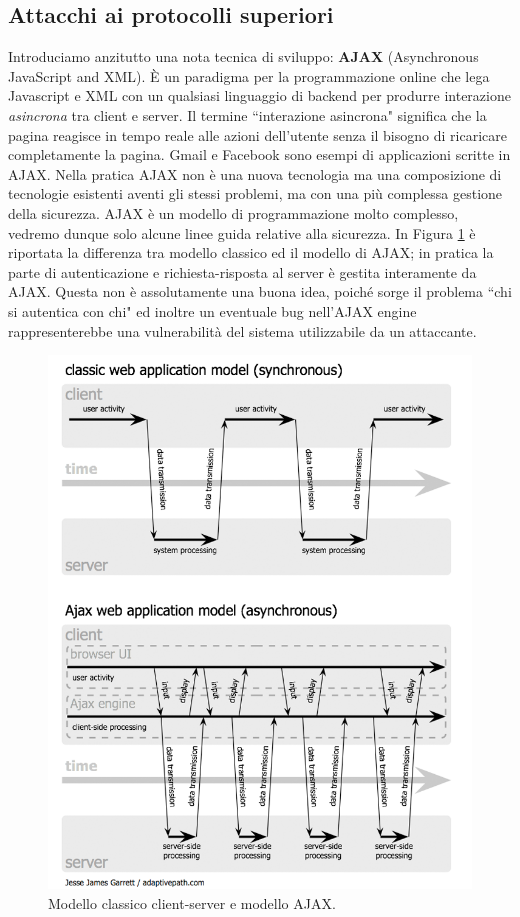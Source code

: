 \subsection{Attacchi ai protocolli superiori}
Introduciamo anzitutto una nota tecnica di sviluppo: \textbf{AJAX} (Asynchronous JavaScript and XML). È un paradigma per la programmazione online che lega Javascript e XML con un qualsiasi linguaggio di backend per produrre interazione \textit{asincrona} tra client e server. Il termine \textquotedblleft interazione asincrona" significa che la pagina reagisce in tempo reale alle azioni dell'utente senza il bisogno di ricaricare completamente la pagina. Gmail e Facebook sono esempi di applicazioni scritte in AJAX. Nella pratica AJAX non è una nuova tecnologia ma una composizione di tecnologie esistenti aventi gli stessi problemi, ma con una più complessa gestione della sicurezza. AJAX è un modello di programmazione molto complesso, vedremo dunque solo alcune linee guida relative alla sicurezza. In Figura \ref{img:ajax-model} è riportata la differenza tra modello classico ed il modello di AJAX; in pratica la parte di autenticazione e richiesta-risposta al server è gestita interamente da AJAX. Questa non è assolutamente una buona idea, poiché sorge il problema \textquotedblleft chi si autentica con chi" ed inoltre un eventuale bug nell'AJAX engine rappresenterebbe una vulnerabilità del sistema utilizzabile da un attaccante.
\begin{figure}[htbp]
	\centering
	\includegraphics[scale = 0.35]{images/ajax-model}
	\caption{Modello classico client-server e modello AJAX.}
	\label{img:ajax-model}
\end{figure}\\
